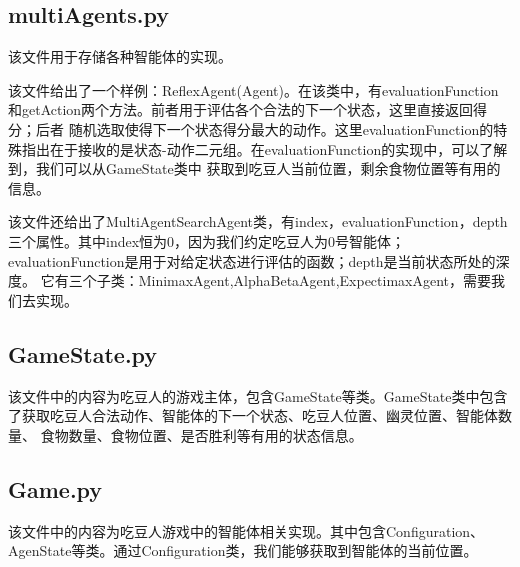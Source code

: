 \subsection{multiAgents.py}
该文件用于存储各种智能体的实现。

该文件给出了一个样例：ReflexAgent(Agent)。在该类中，有evaluationFunction和getAction两个方法。前者用于评估各个合法的下一个状态，这里直接返回得分；后者
随机选取使得下一个状态得分最大的动作。这里evaluationFunction的特殊指出在于接收的是状态-动作二元组。在evaluationFunction的实现中，可以了解到，我们可以从GameState类中
获取到吃豆人当前位置，剩余食物位置等有用的信息。

该文件还给出了MultiAgentSearchAgent类，有index，evaluationFunction，depth三个属性。其中index恒为0，因为我们约定吃豆人为0号智能体；
evaluationFunction是用于对给定状态进行评估的函数；depth是当前状态所处的深度。
它有三个子类：MinimaxAgent,AlphaBetaAgent,ExpectimaxAgent，需要我们去实现。
\subsection{GameState.py}
该文件中的内容为吃豆人的游戏主体，包含GameState等类。GameState类中包含了获取吃豆人合法动作、智能体的下一个状态、吃豆人位置、幽灵位置、智能体数量、
食物数量、食物位置、是否胜利等有用的状态信息。
\subsection{Game.py}
该文件中的内容为吃豆人游戏中的智能体相关实现。其中包含Configuration、AgenState等类。通过Configuration类，我们能够获取到智能体的当前位置。